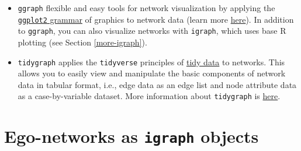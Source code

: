 \documentclass[
]{book}
\providecommand{\tightlist}{%
  \setlength{\itemsep}{0pt}\setlength{\parskip}{0pt}}
\begin{document}
\begin{itemize}
  \begin{itemize}
  \tightlist
  \item
    \texttt{ggraph} flexible and easy tools for network visualization by applying the \href{https://ggplot2.tidyverse.org/}{\texttt{ggplot2} grammar} of graphics to network data (learn more \href{https://github.com/thomasp85/ggraph}{here}). In addition to \texttt{ggraph}, you can also visualize networks with \texttt{igraph}, which uses base R plotting (see Section \ref{more-igraph}).
  \item
    \texttt{tidygraph} applies the \texttt{tidyverse} principles of \href{https://r4ds.had.co.nz/tidy-data.html}{tidy data} to networks. This allows you to easily view and manipulate the basic components of network data in tabular format, i.e., edge data as an edge list and node attribute data as a case-by-variable dataset. More information about \texttt{tidygraph} is \href{https://www.data-imaginist.com/2017/introducing-tidygraph/}{here}.
  \end{itemize}
\end{itemize}

\hypertarget{ego-networks-as-igraph-objects}{%
\section{\texorpdfstring{Ego-networks as \texttt{igraph} objects}{Ego-networks as igraph objects}}\label{ego-networks-as-igraph-objects}}
\end{document}
